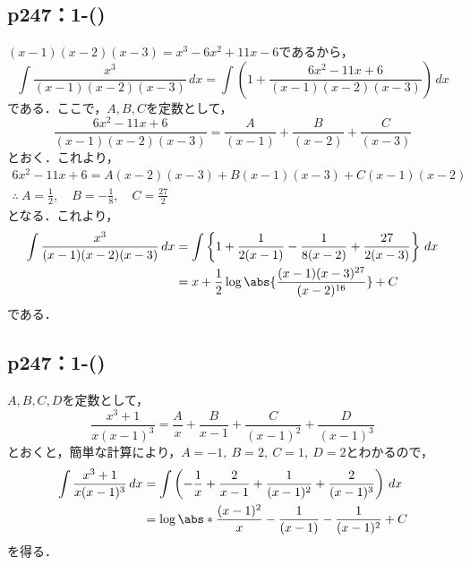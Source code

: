 \documentclass[a4paper,10pt,fleqn]{ltjsarticle}
\begin{document}
\subsection*{p247：1-()}

\begin{tleftbar}
    $(x-1)(x-2)(x-3)=x^3 -6x^2+11x-6$であるから，
    \[
        \int \frac{x^3}{(x-1)(x-2)(x-3)} \, dx  = \int \left (1+ \frac{6x^2-11x+6}{(x-1)(x-2)(x-3)}\right) \, dx
    \]
    である．ここで，$A,B,C$を定数として，
    \[
        \frac{6x^2-11x+6}{(x-1)(x-2)(x-3)} = \frac{A}{(x-1)}+\frac{B}{(x-2)}+\frac{C}{(x-3)}
    \]
    とおく．これより，
    \begin{gather*}
        6x^2-11x+6 = A(x-2)(x-3)+B (x-1)(x-3)+C(x-1)(x-2) \\
        \therefore ~ A = \frac{1}{2}, \quad B = -\frac{1}{8},\quad C= \frac{27}{2}
    \end{gather*}
    となる．これより，
    \begin{align*}
        \int \frac{x^3}{(x-1)(x-2)(x-3)} \, dx & = \int \left \{ 1+ \frac{1}{2(x-1)} - \frac{1}{8(x-2)}+\frac{27}{2(x-3)} \right \} \, dx \\
                                               & = x + \frac{1}{2} \log \abs{\frac{(x-1)(x-3)^{27}}{(x-2)^{16}}}+C
    \end{align*}
    である．
\end{tleftbar}

\subsection*{p247：1-()}

\begin{tleftbar}
    $A,B,C,D$を定数として，
    \[
        \frac{x^3+1}{x(x-1)^3} = \frac{A}{x}+\frac{B}{x-1}+\frac{C}{(x-1)^2}+\frac{D}{(x-1)^3}
    \]
    とおくと，簡単な計算により，$A=-1,~B=2,~C=1,~D=2$とわかるので，
    \begin{align*}
        \int \frac{x^3+1}{x(x-1)^3} \, dx & = \int \left (-\frac{1}{x}+\frac{2}{x-1}+\frac{1}{(x-1)^2}+\frac{2}{(x-1)^3} \right ) \, dx \\
                                          & = \log \abs*{\frac{(x-1)^2}{x}} -\frac{1}{(x-1)}-\frac{1}{(x-1)^2}+ C
    \end{align*}
    を得る．
\end{tleftbar}
\end{document}
